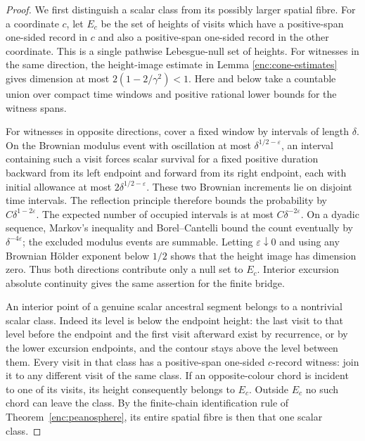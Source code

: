 \begin{proof}
We first distinguish a scalar class from its possibly larger spatial
fibre.  For a coordinate \(c\), let \(E_c\) be the set of heights of
visits which have a positive-span one-sided record in \(c\) and also
a positive-span one-sided record in the other coordinate.  This is
a single pathwise Lebesgue-null set of heights.  For witnesses in the
same direction, the height-image estimate in Lemma
\ref{enc:cone-estimates} gives dimension at most
\(2(1-2/\gamma^2)<1\).  Here and below take a countable union over
compact time windows and positive rational lower bounds for the
witness spans.

For witnesses in opposite directions, cover a fixed window by intervals
of length \(\delta\).  On the Brownian modulus event with oscillation
at most \(\delta^{1/2-\varepsilon}\), an interval containing such a
visit forces scalar survival for a fixed positive duration backward
from its left endpoint and forward from its right endpoint, each
with initial allowance at most \(2\delta^{1/2-\varepsilon}\).
These two Brownian increments lie on disjoint time intervals.
The reflection principle therefore bounds the probability by
\(C\delta^{1-2\varepsilon}\).  The expected number of occupied
intervals is at most \(C\delta^{-2\varepsilon}\).
On a dyadic sequence, Markov's inequality and Borel--Cantelli bound
the count eventually by \(\delta^{-4\varepsilon}\); the excluded
modulus events are summable.  Letting \(\varepsilon\downarrow0\)
and using any Brownian H\"older exponent below \(1/2\) shows that
the height image has dimension zero.  Thus both directions contribute
only a null set to \(E_c\).  Interior excursion absolute continuity
gives the same assertion for the finite bridge.

An interior point of a genuine scalar ancestral segment belongs to a
nontrivial scalar class.  Indeed its level is below the endpoint
height: the last visit to that level before the endpoint and the
first visit afterward exist by recurrence, or by the lower excursion
endpoints, and the contour stays above the level between them.
Every visit in that class has a positive-span
one-sided \(c\)-record witness: join it to any different visit of the
same class.  If an opposite-colour chord is incident to one of its
visits, its height consequently belongs to \(E_c\).  Outside \(E_c\)
no such chord can leave the class.  By the finite-chain identification
rule of Theorem~\ref{enc:peanosphere}, its entire spatial fibre is then
that one scalar class.


\end{proof}

